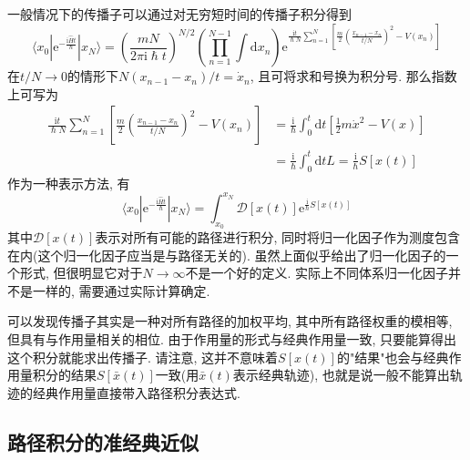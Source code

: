         \splitline

        一般情况下的传播子可以通过对无穷短时间的传播子积分得到
        \begin{equation}
            \langle x_0 | \mathrm{e}^{-\frac {\mathrm{i}\hat{H}t}{\hslash}} | x_N \rangle = \left(\frac{mN}{2\pi\mathrm{i}\hslash t}\right)^{N/2} \left(\prod_{n = 1}^{N-1}\int 
            \mathrm{d} x_n \right) \mathrm{e}^{ \frac{\mathrm{i}t}{\hslash N} \sum_{n = 1}^{N} \left[ \frac{m}{2} \left(\frac{x_{n-1} - x_n}{t/N}\right)^2 - V(x_n)\right] }
        \end{equation}
        在$t/N \to 0$的情形下$N(x_{n-1} - x_n)/t = \dot x_n$, 且可将求和号换为积分号. 那么指数上可写为
        \begin{equation}\begin{aligned}
            \frac{\mathrm{i}t}{\hslash N} \sum_{n = 1}^{N} \left[ \frac{m}{2} \left(\frac{x_{n-1} - x_n}{t/N}\right)^2 - V(x_n)\right] 
            &= \frac{\mathrm{i}}{\hslash} \int_0^t \mathrm{d}t \left[ \frac{1}{2} m \dot x^2 - V(x) \right]\\
            &= \frac{\mathrm{i}}{\hslash} \int_0^t \mathrm{d}t L = \frac{\mathrm{i}}{\hslash} S[x(t)]
        \end{aligned}\end{equation}
        作为一种表示方法, 有\cite{费曼量子力学与路径积分}
        \begin{equation}\label{eq:8-2-1}
            \langle x_0 | \mathrm{e}^{-\frac {\mathrm{i}\hat{H}t}{\hslash}} | x_N \rangle 
            = \int_{x_0}^{x_N} \mathcal{D}[x(t)] \mathrm{e}^{ \frac{\mathrm{i}}{\hslash} S[x(t)] }
        \end{equation}
        其中$\mathcal{D}[x(t)]$表示对所有可能的路径进行积分, 同时将归一化因子作为测度包含在内(这个归一化因子应当是与路径无关的). 
        虽然上面似乎给出了归一化因子的一个形式, 但很明显它对于$N \to \infty$不是一个好的定义. 
        实际上不同体系归一化因子并不是一样的, 需要通过实际计算确定. 

        可以发现传播子其实是一种对所有路径的加权平均, 其中所有路径权重的模相等, 但具有与作用量相关的相位. 
        由于作用量的形式与经典作用量一致, 只要能算得出这个积分就能求出传播子. 
        请注意, 这并不意味着$S[x(t)]$的"结果"也会与经典作用量积分的结果$S[\bar x(t)]$一致(用$\bar x(t)$表示经典轨迹), 
        也就是说一般不能算出轨迹的经典作用量直接带入路径积分表达式.

        \subsection{路径积分的准经典近似}

